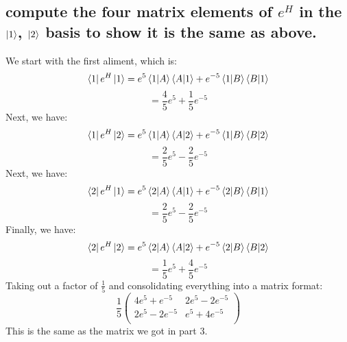 \documentclass{article}
\begin{document}
\subsection{compute the four matrix elements of \( e^H \) in the \( \ket{1} \), \( \ket{2} \) basis to show it is the same as above.}

We start with the first aliment, which is:
\begin{equation}
    \bra{1}e^H\ket{1} = e^5 \bra{1}\ket{A}\bra{A}\ket{1} + e^{-5} \bra{1}\ket{B}\bra{B}\ket{1}
\end{equation}
\begin{equation}
    = \frac{4}{5}e^5 + \frac{1}{5}e^{-5}
\end{equation}
Next, we have:
\begin{equation}
    \bra{1}e^H\ket{2} = e^5 \bra{1}\ket{A}\bra{A}\ket{2} + e^{-5} \bra{1}\ket{B}\bra{B}\ket{2}
\end{equation}
\begin{equation}
    = \frac{2}{5}e^5 - \frac{2}{5}e^{-5}
\end{equation}
Next, we have:
\begin{equation}
    \bra{2}e^H\ket{1} = e^5 \bra{2}\ket{A}\bra{A}\ket{1} + e^{-5} \bra{2}\ket{B}\bra{B}\ket{1}
\end{equation}
\begin{equation}
    = \frac{2}{5}e^5 - \frac{2}{5}e^{-5}
\end{equation}
Finally, we have:
\begin{equation}
    \bra{2}e^H\ket{2} = e^5 \bra{2}\ket{A}\bra{A}\ket{2} + e^{-5} \bra{2}\ket{B}\bra{B}\ket{2}
\end{equation}
\begin{equation}
    = \frac{1}{5}e^5 + \frac{4}{5}e^{-5}
\end{equation}
Taking out a factor of $\frac{1}{5}$ and consolidating everything into a matrix format:
\begin{equation}
\boxed{\frac{1}{5}
    \begin{pmatrix}
        4e^5 + e^{-5} & 2e^5 - 2e^{-5} \\
        2e^5 - 2e^{-5} & e^5 + 4e^{-5} \\
    \end{pmatrix}}\end{equation}
This is the same as the matrix we got in part 3.




\end{document}
